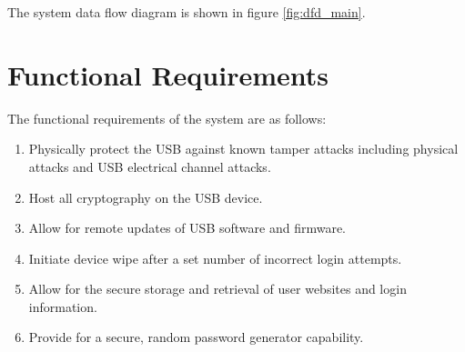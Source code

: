 The system data flow diagram is shown in figure \ref{fig:dfd_main}.


\section{Functional Requirements}
\label{sec:funcreq}
The functional requirements of the system are as follows:
\begin{enumerate}
    \item{Physically protect the USB against known tamper attacks including physical attacks and USB electrical channel attacks.}
    \item{Host all cryptography on the USB device.}
    \item{Allow for remote updates of USB software and firmware.}
    \item{Initiate device wipe after a set number of incorrect login attempts.}
    \item{Allow for the secure storage and retrieval of user websites and login information.}
    \item{Provide for a secure, random password generator capability.}
\end{enumerate}




